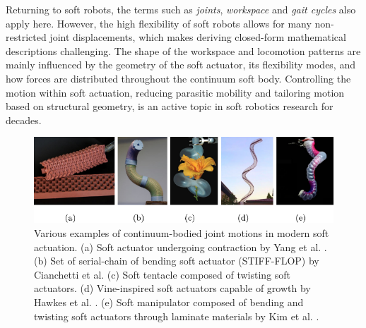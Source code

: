 Returning to soft robots, the terms such as \textit{joints}, \textit{workspace} and \textit{gait cycles} also apply here. However, the high flexibility of soft robots allows for many non-restricted joint displacements, which makes deriving closed-form mathematical descriptions challenging. The shape of the workspace and locomotion patterns are mainly influenced by the geometry of the soft actuator, its flexibility modes, and how forces are distributed throughout the continuum soft body. Controlling the motion within soft actuation, reducing parasitic mobility and tailoring motion based on structural geometry, is an active topic in soft robotics research for decades. \\

\begin{figure}[!t]
  \centering
  \includegraphics*[width=\textwidth]{./pdf/thesis-figurex-1-2.pdf}
  \vspace{-6mm}
  \caption{\small Various examples of continuum-bodied joint motions in modern soft actuation. (a) Soft actuator undergoing contraction by Yang et al. \cite{Yang2016}. (b) Set of serial-chain of bending soft actuator (STIFF-FLOP) by Cianchetti et al. \cite{Cianchetti2013Nov,Cianchetti2014} (c) Soft tentacle composed of twisting soft actuators. (d) Vine-inspired soft actuators capable of growth by Hawkes et al. \cite{Hawkes2017}. (e) Soft manipulator composed of bending and twisting soft actuators through laminate materials by Kim et al. \cite{Kim2019Aug}.}
  \label{fig:C0:actuationtypes}
\end{figure}
%
\vspace{-4mm}
